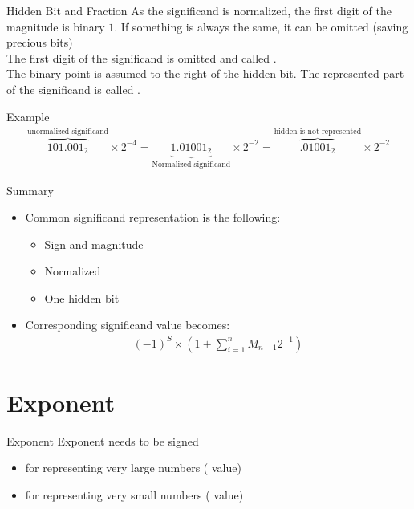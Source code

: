    \begin{parag}{Hidden Bit and Fraction}
       As the significand is normalized, the first digit of the magnitude is  binary $1$. If something is always the same, it can be omitted (saving precious bits)\\
       The first digit of the significand is omitted and called . \\
       The binary point is assumed to the right of the hidden bit. The represented part of the significand is called .
   
       \begin{subparag}{Example}
           \begin{align*}
               \overbrace{101.001_2}^{ \text{unormalized significand}} \times 2^{-4}  = \underbrace{1.01001_2}_{ \text{Normalized significand}} \times 2^{-2} = \overbrace{.01001_2}^{ \text{hidden is not represented}} \times 2^{-2}
           \end{align*}
           
           
       \end{subparag}
   \end{parag}
   \begin{parag}{Summary}
       \begin{itemize}
           \item Common significand representation is the following:
               \begin{itemize}
                   \item Sign-and-magnitude
                   \item Normalized
                   \item One hidden bit
               \end{itemize}
           \item Corresponding significand value becomes:
               \begin{align*}
                   (-1)^S \times (1 + \sum_{i=1}^n M_{n-1} 2^{-1})
               \end{align*}
               
       \end{itemize}
   
   \end{parag}
   
      \section{Exponent}
      \begin{parag}{Exponent}
          Exponent needs to be signed
          \begin{itemize}
              \item {} for representing very large numbers (  value)
              \item {} for representing very small numbers (  value)
          \end{itemize}
      
      \end{parag}
      
